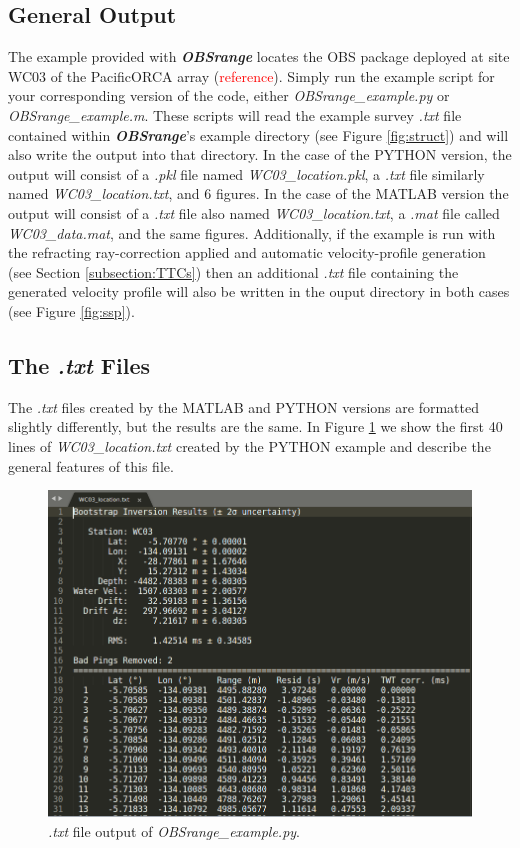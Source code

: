 \documentclass[titlepage, 12pt]{article}
\begin{document}
  \subsection{General Output}
  The example provided with \textbf{\textit{OBSrange}} locates the OBS package deployed at site WC03 of the PacificORCA array (\textcolor{red}{reference}). Simply run the example script for your corresponding version of the code, either \textit{OBSrange\_example.py} or \textit{OBSrange\_example.m}. These scripts will read the example survey \textit{.txt} file contained within \textbf{\textit{OBSrange}}'s  example directory (see Figure \ref{fig:struct}) and will also write the output into that directory.  In the case of the PYTHON version, the output will consist of a \textit{.pkl} file named \textit{WC03\_location.pkl}, a \textit{.txt} file similarly named \textit{WC03\_location.txt}, and 6 figures. In the case of the MATLAB version the output will consist of a \textit{.txt} file also named \textit{WC03\_location.txt}, a \textit{.mat} file called \textit{WC03\_data.mat}, and the same figures. Additionally, if the example is run with the refracting ray-correction applied and automatic velocity-profile generation (see Section \ref{subsection:TTCs}) then an additional \textit{.txt} file containing the generated velocity profile will also be written in the ouput directory in both cases (see Figure \ref{fig:ssp}).

  \subsection{The \textit{.txt} Files}
  The \textit{.txt} files created by the MATLAB and PYTHON versions are formatted slightly differently, but the results are the same. In Figure \ref{fig:ex} we show the first 40 lines of \textit{WC03\_location.txt} created by the PYTHON example and describe the general features of this file.\\

  \begin{figure}[!htb]
   \includegraphics[width=\linewidth]{example_txt_fle.png}
   \caption{\textit{.txt} file output of \textit{OBSrange\_example.py}.}
   \label{fig:ex}
  \end{figure}
\end{document}
